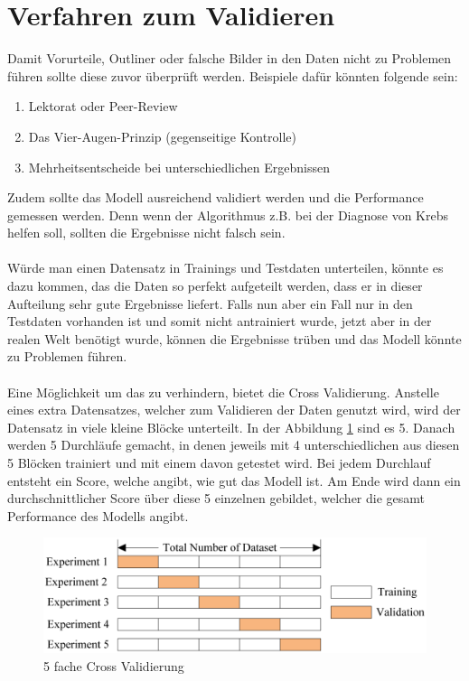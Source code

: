 \documentclass[12pt,oneside,a4paper,parskip]{scrbook}
\begin{document}
\section{Verfahren zum Validieren}
\label{section:validate}

Damit Vorurteile, Outliner oder falsche Bilder in den Daten nicht zu Problemen führen sollte diese zuvor überprüft werden. Beispiele dafür könnten folgende sein:
\begin{enumerate}
	\item Lektorat oder Peer-Review
	\item Das Vier-Augen-Prinzip (gegenseitige Kontrolle)
	\item Mehrheitsentscheide bei unterschiedlichen Ergebnissen
\end{enumerate}

Zudem sollte das Modell ausreichend validiert werden und die Performance gemessen werden. Denn wenn der Algorithmus z.B. bei der Diagnose von Krebs helfen soll, sollten die Ergebnisse nicht falsch sein.
\\\\
Würde man einen Datensatz in Trainings und Testdaten unterteilen, könnte es dazu kommen, das die Daten so perfekt aufgeteilt werden, dass er in dieser Aufteilung sehr gute Ergebnisse liefert. Falls nun aber ein Fall nur in den Testdaten vorhanden ist und somit nicht antrainiert wurde, jetzt aber in der realen Welt benötigt wurde, können die Ergebnisse trüben und das Modell könnte zu Problemen führen.
\\\\
Eine Möglichkeit um das zu verhindern, bietet die Cross Validierung. Anstelle eines extra Datensatzes, welcher zum Validieren der Daten genutzt wird, wird der Datensatz in viele kleine Blöcke unterteilt. In der Abbildung \ref{fig:crossValidierung} sind es 5. Danach werden 5 Durchläufe gemacht, in denen jeweils mit 4 unterschiedlichen aus diesen 5 Blöcken trainiert und mit einem davon getestet wird. Bei jedem Durchlauf entsteht ein Score, welche angibt, wie gut das Modell ist. Am Ende wird dann ein durchschnittlicher Score über diese 5 einzelnen gebildet, welcher die gesamt Performance des Modells angibt.

\begin{figure}[h]
	\begin{center}
		\includegraphics[width=15cm]{Bilder/crossValidierung.png}
		\caption{5 fache Cross Validierung}
		\label{fig:crossValidierung}
	\end{center}
\end{figure}
\end{document}
